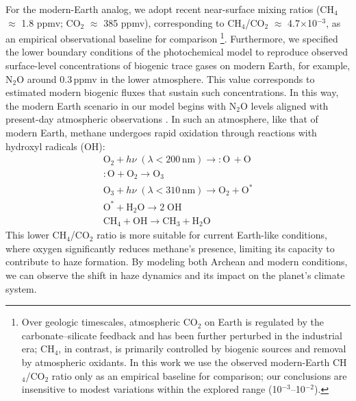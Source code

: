 For the modern-Earth analog, we adopt recent near-surface mixing ratios (CH$_4$ $\approx$ 1.8 ppmv; CO$_2$ $\approx$ 385 ppmv), corresponding to CH$_4$/CO$_2$ $\approx$ 4.7$\times$10$^{-3}$, as an empirical observational baseline for comparison \citep[e.g.,][]{IPCC.2021AR6}\footnote{Over geologic timescales, atmospheric CO$_2$ on Earth is regulated by the carbonate--silicate feedback and has been further perturbed in the industrial era; CH$_4$, in contrast, is primarily controlled by biogenic sources and removal by atmospheric oxidants. In this work we use the observed modern-Earth CH$_4$/CO$_2$ ratio only as an empirical baseline for comparison; our conclusions are insensitive to modest variations within the explored range (10$^{-3}$--10$^{-2}$).}.
Furthermore, we specified the lower boundary conditions of the photochemical model to reproduce observed surface-level concentrations of biogenic trace gases on modern Earth, for example, N$_2$O around 0.3\,ppmv in the lower atmosphere. This value corresponds to estimated modern biogenic fluxes that sustain such concentrations. In this way, the modern Earth scenario in our model begins with N$_2$O levels aligned with present-day atmospheric observations \citep[see][]{IPCC.2021AR6}.
In such an atmosphere, like that of modern Earth, methane undergoes rapid oxidation through reactions with hydroxyl radicals (OH):
\begin{equation}
\begin{gathered}
\text{O}_2 + h\nu \; (\lambda < 200\,\textrm{nm})  \xrightarrow{} :\text{O}\,+ \text{O} \\
:\text{O} + \text{O}_2     \xrightarrow{} \text{O}_3 \\
\text{O}_3 + h\nu \; (\lambda < 310\,\textrm{nm})  \xrightarrow{} \text{O}_2 + \text{O}^* \\
\text{O}^* + \text{H}_2\text{O}    \xrightarrow{} 2\;\text{OH} \\
\text{CH}_4 + \text{OH}    \xrightarrow{} \text{CH}_3 + \text{H}_2\text{O}
\end{gathered}
\label{eq:CH4}
\end{equation}
This lower CH$_4$/CO$_2$ ratio is more suitable for current Earth-like conditions, where oxygen significantly reduces methane's presence, limiting its capacity to contribute to haze formation. By modeling both Archean and modern conditions, we can observe the shift in haze dynamics and its impact on the planet's climate system.

